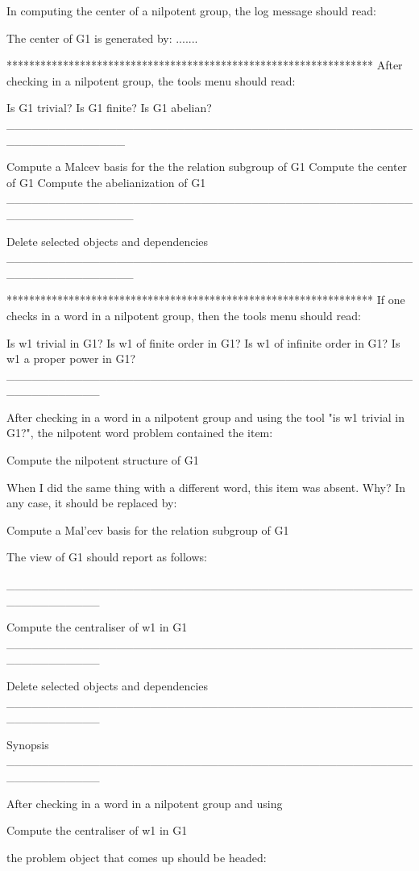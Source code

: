 In computing the center of a nilpotent group, the log message
should read:

The center of G1 is generated by: .......

*****************************************************************
After checking in a nilpotent group, the tools menu should 
read:

Is G1 trivial?
Is G1 finite?
Is G1 abelian?
______________________________________________________________

Compute a Malcev basis for the the relation subgroup of G1
Compute the center of G1
Compute the abelianization of G1
_______________________________________________________________

Delete selected objects and dependencies
_______________________________________________________________

*****************************************************************
If one checks in a word in a nilpotent group, then the
tools menu should read:



Is w1 trivial in G1?
Is w1 of finite order in G1?
Is w1 of infinite order in G1?
Is w1 a proper power in G1?
___________________________________________________________

After checking in a word in a nilpotent group and using
the tool "is w1 trivial in G1?",  the nilpotent word problem
contained the item:

Compute the nilpotent structure of G1

When I did the same thing with a different word, this item
was absent. Why? In any case, it should be replaced by:

Compute a Mal'cev basis for the relation subgroup of G1

The view of G1 should report as follows:

___________________________________________________________

Compute the centraliser of w1 in G1
___________________________________________________________

Delete selected objects and dependencies
___________________________________________________________

Synopsis
___________________________________________________________

After checking in a word in a nilpotent group and using

Compute the centraliser of w1 in G1

the problem object that comes up should be headed:

